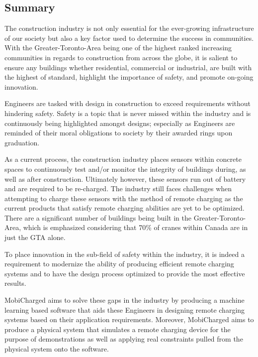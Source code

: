 \documentclass[12pt, titlepage]{article}
\begin{document}
\subsection{Summary}
The construction industry is not only essential for the ever-growing infrastructure of our society but also a key factor used to determine the success in communities. With the Greater-Toronto-Area being one of the highest ranked increasing communities in regards to construction from across the globe, it is salient to ensure any buildings whether residential, commercial or industrial, are built with the highest of standard, highlight the importance of safety, and promote on-going innovation. 
\par
Engineers are tasked with design in construction to exceed requirements without hindering safety. Safety is a topic that is never missed within the industry and is continuously being highlighted amongst designs; especially as Engineers are reminded of their moral obligations to society by their awarded rings upon graduation. 
\par
As a current process, the construction industry places sensors within concrete spaces to continuously test and/or monitor the integrity of buildings during, as well as after construction. Ultimately however, these sensors run out of battery and are required to be re-charged. The industry still faces challenges when attempting to charge these sensors with the method of remote charging as the current products that satisfy remote charging abilities are yet to be optimized. There are a significant number of buildings being built in the Greater-Toronto-Area, which is emphasized considering that 70\% of cranes within Canada are in just the GTA alone. 
\par
To place innovation in the sub-field of safety within the industry, it is indeed a requirement to modernize the ability of producing efficient remote charging systems and to have the design process optimized to provide the most effective results. 
\par
MobiCharged aims to solve these gaps in the industry by producing a machine learning based software that aids these Engineers in designing remote charging systems based on their application requirements. Moreover, MobiCharged aims to produce a physical system that simulates a remote charging device for the purpose of demonstrations as well as applying real constraints pulled from the physical system onto the software.
\end{document}
